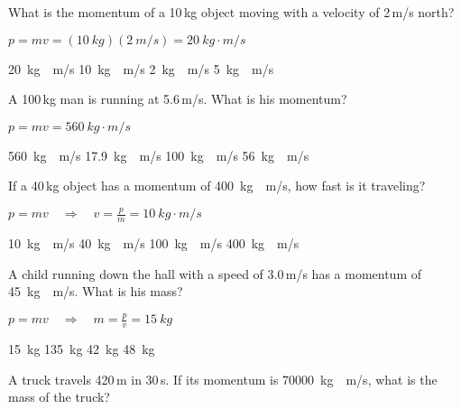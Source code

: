 \documentclass[]{exam}
\begin{document}
\begin{questions}
    

\question 
What is the momentum of a 10\,kg object moving with a velocity of 2\,m/s north?

\ifprintanswers
{\color{red}
$p = mv = (\SI{10}{kg})(\SI{2}{m/s}) = \boxed{\SI{20}{kg\cdot m/s}}$
}
\fi

\begin{randomizechoices}
    \correctchoice \SI{20}{kg\cdot m/s}
    \choice \SI{10}{kg\cdot m/s}
    \choice \SI{2}{kg\cdot m/s}
    \choice \SI{5}{kg\cdot m/s}
\end{randomizechoices}


\question %
A 100\,kg man is running at 5.6\,m/s. What is his momentum? 

\ifprintanswers
{\color{red}
$p = mv = \boxed{\SI{560}{kg\cdot m/s}}$
}
\fi

\begin{randomizechoices}
    \correctchoice \SI{560}{kg\cdot m/s}
    \choice \SI{17.9}{kg\cdot m/s}
    \choice \SI{100}{kg\cdot m/s}
    \choice \SI{56}{kg\cdot m/s}
\end{randomizechoices}

\question %
If a 40\,kg object has a momentum of \SI{400}{kg\cdot m/s}, how fast is it traveling?

\ifprintanswers
{\color{red}
$p = mv \quad \Rightarrow \quad v = \frac{p}{m} = \boxed{\SI{10}{kg\cdot m/s}}$}
\fi

\begin{randomizechoices}
    \correctchoice \SI{10}{kg\cdot m/s}
    \choice \SI{40}{kg\cdot m/s}
    \choice \SI{100}{kg\cdot m/s}
    \choice \SI{400}{kg\cdot m/s}
\end{randomizechoices}


\question %
A child running down the hall with a speed of 3.0\,m/s has a momentum of \SI{45}{kg\cdot m/s}. What is his mass?

\ifprintanswers
{\color{red}
$p = mv \quad \Rightarrow \quad m = \frac{p}{v} = \boxed{\SI{15}{kg}}$}
\fi

\begin{randomizechoices}
    \correctchoice \SI{15}{kg}
    \choice \SI{135}{kg}
    \choice \SI{42}{kg}
    \choice \SI{48}{kg}
\end{randomizechoices}



\question %
A truck travels 420\,m in 30\,s.  If its momentum is \SI[group-separator={,}]{70000}{kg\cdot m/s}, what is the mass of the truck? 


\end{questions}
\end{document}
